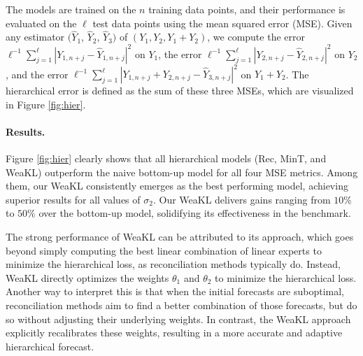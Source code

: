 The models are trained on the $n$ training data points, and their performance is evaluated on the $\ell$ test data points using the mean squared error (MSE). Given any estimator $(\hat{Y}_1$, $\hat{Y}_2$, $\hat{Y}_3)$ of $(Y_1, Y_2, Y_1+Y_2)$, we compute the error $\ell^{-1}\sum_{j=1}^\ell| Y_{1, n+j}- \hat Y_{1, n+j}|^2$ on $Y_1$, the error $\ell^{-1}\sum_{j=1}^\ell| Y_{2, n+j}- \hat Y_{2, n+j}|^2$ on $Y_2$, and the error $\ell^{-1}\sum_{j=1}^\ell| Y_{1, n+j} + Y_{2, n+j}- \hat Y_{3, n+j}|^2$ on $Y_1 + Y_2$. 
The hierarchical error is defined as the sum of these three MSEs, which are visualized in Figure \ref{fig:hier}. 

\paragraph{Results.} Figure \ref{fig:hier} clearly shows that all hierarchical models (Rec, MinT, and WeaKL) outperform the naive bottom-up model for all four MSE metrics. Among them, our WeaKL consistently emerges as the best performing model, achieving superior results for all values of $\sigma_2$. Our WeaKL delivers gains ranging from $10\%$ to $50\%$ over the bottom-up model, solidifying its effectiveness in the benchmark.

The strong performance of WeaKL can be attributed to its approach, which goes beyond simply computing the best linear combination of linear experts to minimize the hierarchical loss, as reconciliation methods typically do. Instead, WeaKL directly optimizes the weights $\theta_1$ and $\theta_2$ to minimize the hierarchical loss.
Another way to interpret this is that when the initial forecasts are suboptimal, reconciliation methods aim to find a better combination of those forecasts, but do so without adjusting their underlying weights. In contrast, the WeaKL approach explicitly recalibrates these weights, resulting in a more accurate and adaptive hierarchical forecast.

